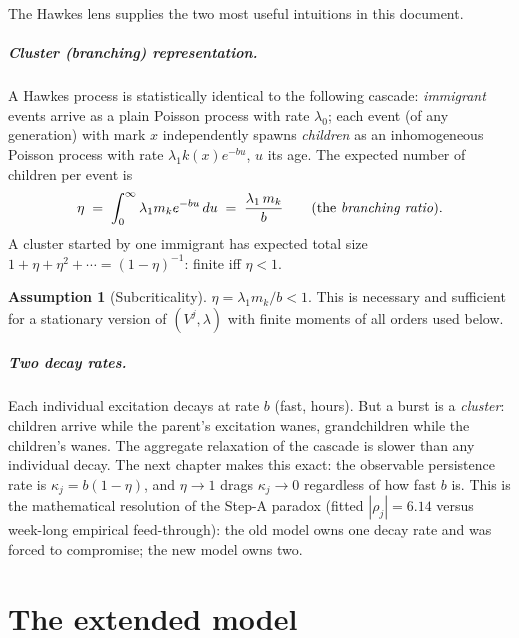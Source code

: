 \documentclass[11pt]{report}
\theoremstyle{definition}
\newtheorem{assumption}[theorem]{Assumption}
\theoremstyle{remark}
\newcommand{\Vj}{V^{j}}
\newcommand{\mk}{m_{k}}
\begin{document}
The Hawkes lens supplies the two most useful intuitions in this document.

\paragraph{Cluster (branching) representation.} A Hawkes process is
statistically identical to the following cascade: \emph{immigrant} events
arrive as a plain Poisson process with rate $\lambda_{0}$; each event (of any
generation) with mark $x$ independently spawns \emph{children} as an
inhomogeneous Poisson process with rate $\lambda_{1}k(x)e^{-bu}$, $u$ its
age. The expected number of children per event is
\begin{equation}\label{eq:eta}
\eta \;=\; \int_0^\infty \lambda_1 m_k e^{-bu}\,du
\;=\; \frac{\lambda_{1}\,\mk}{b}
\qquad\text{(the \emph{branching ratio}).}
\end{equation}
A cluster started by one immigrant has expected total size
$1+\eta+\eta^{2}+\cdots=(1-\eta)^{-1}$: finite iff $\eta<1$.

\begin{assumption}[Subcriticality]\label{ass:subcritical}
$\eta=\lambda_{1}\mk/b<1$. This is necessary and sufficient for a stationary
version of $(\Vj,\lambda)$ with finite moments of all orders used below.
\end{assumption}

\paragraph{Two decay rates.} Each individual excitation decays at rate $b$
(fast, hours). But a burst is a \emph{cluster}: children arrive while the
parent's excitation wanes, grandchildren while the children's wanes. The
aggregate relaxation of the cascade is slower than any individual decay. The
next chapter makes this exact: the observable persistence rate is
$\kappa_{j}=b(1-\eta)$, and $\eta\to1$ drags $\kappa_j\to0$ regardless of
how fast $b$ is. This is the mathematical resolution of the Step-A paradox
(fitted $|\rho_j|=6.14$ versus week-long empirical feed-through): the old
model owns one decay rate and was forced to compromise; the new model owns
two.

\chapter{The extended model}
\label{ch:model}
\end{document}
